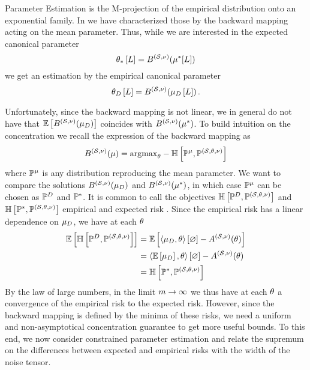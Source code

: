 

Parameter Estimation is the M-projection of the empirical distribution onto an exponential family.
In  we have characterized those by the backward mapping acting on the mean parameter.
Thus, while we are interested in the expected canonical parameter
\[
    \theta_{*}\left[L\right] = B^{(\mathcal{S},\nu)}(\mu^*[L])
\]
we get an estimation by the empirical canonical parameter
\[
    \theta_{D}\left[L\right]  = B^{(\mathcal{S},\nu)}(\mu_{D}\left[L\right]) \, .
\]

Unfortunately, since the backward mapping is not linear, we in general do not have that $\mathbb{E}\left[B^{(\mathcal{S},\nu)}(\mu_{D})\right]$ coincides with $B^{(\mathcal{S},\nu)}(\mu^*)$.
To build intuition on the concentration we recall the expression of the backward mapping as
\begin{align*}
    B^{(\mathcal{S},\nu)}(\mu)
    = \mathrm{argmax}_{\theta} -\mathbb{H}\left[\mathbb{P}^{\mu},\mathbb{P}^{(\mathcal{S},\theta,\nu)}\right]
\end{align*}
where $\mathbb{P}^{\mu}$ is any distribution reproducing the mean parameter.
We want to compare the solutions $B^{(\mathcal{S},\nu)}(\mu_{D})$ and $B^{(\mathcal{S},\nu)}(\mu^*)$, in which case $\mathbb{P}^{\mu}$ can be chosen as $\mathbb{P}^{D}$ and $\mathbb{P}^*$.
It is common to call the objectives $\mathbb{H}\left[\mathbb{P}^{D},\mathbb{P}^{(\mathcal{S},\theta,\nu)}\right]$ and $\mathbb{H}\left[\mathbb{P}^*,\mathbb{P}^{(\mathcal{S},\theta,\nu)}\right]$ empirical and expected risk \cite{shalev-schwartz_shai_understanding_2014}.
Since the empirical risk has a linear dependence on $\mu_{D}$, we have at each $\theta$
\begin{align*}
    \mathbb{E}\left[\mathbb{H}\left[\mathbb{P}^{D},\mathbb{P}^{(\mathcal{S},\theta,\nu)}\right]\right]
    &= \mathbb{E}\left[\left\langle \mu_{D},\theta\right\rangle \left[ \varnothing \right] - A^{(\mathcal{S},\nu)}(\theta)\right] \\
    &= \left\langle \mathbb{E}\left[\mu_{D}\right],\theta\right\rangle \left[ \varnothing \right] - A^{(\mathcal{S},\nu)}(\theta) \\
    &= \mathbb{H}\left[\mathbb{P}^*,\mathbb{P}^{(\mathcal{S},\theta,\nu)}\right]
\end{align*}
By the law of large numbers, in the limit $m\rightarrow\infty$ we thus have at each $\theta$ a convergence of the empirical risk to the expected risk.
However, since the backward mapping is defined by the minima of these risks, we need a uniform and non-asymptotical concentration guarantee to get more useful bounds.
To this end, we now consider constrained parameter estimation and relate the supremum on the differences between expected and empirical risks with the width of the noise tensor.

